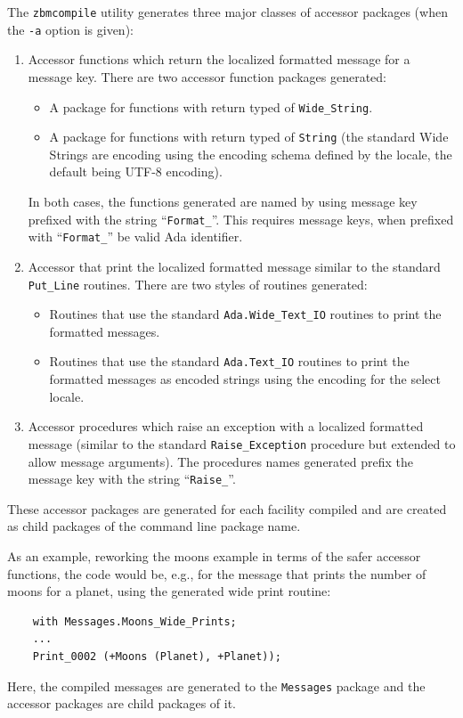 The \texttt{zbmcompile} utility generates three major classes of accessor
packages (when the \texttt{-a} option is given):
\begin{enumerate}
\item	Accessor functions which return the localized formatted message for
	a message key.  There are two accessor function packages generated:
	\begin{itemize}
	\item	A package for functions with return typed of
	 	\texttt{Wide\_String}.
	\item	A package for functions with return typed of \texttt{String}
		(the standard Wide Strings are encoding using the encoding
                schema defined by the locale, the default being UTF-8 encoding).
	\end{itemize}
	In both cases, the functions generated are named by using message key
	prefixed with the string ``\texttt{Format\_}''.  This requires message
	keys, when prefixed with ``\texttt{Format\_}''  be valid Ada identifier.
\item   Accessor that print the localized formatted message similar to the
        standard \texttt{Put\_Line} routines.  There are two styles of routines
        generated:
        \begin{itemize}
        \item Routines that use the standard \texttt{Ada.Wide\_Text\_IO}
              routines to print the formatted messages.
        \item Routines that use the standard \texttt{Ada.Text\_IO}
              routines to print the formatted messages as encoded strings
              using the encoding for the select locale.
        \end{itemize}
\item	Accessor procedures which raise an exception with a localized formatted
	message (similar to the standard \texttt{Raise\_Exception} procedure
	but extended to allow message arguments).  The procedures names
	generated prefix the message key with the string ``\texttt{Raise\_}''.
\end{enumerate}

These accessor packages are generated for each facility compiled and are
created as child packages of the command line package name.

As an example, reworking the moons example in terms of the safer accessor
functions, the code would be, e.g., for the message that prints the number
of moons for a planet, using the generated wide print routine:
\begin{xmpl}
\begin{verbatim}
    with Messages.Moons_Wide_Prints;
    ...
    Print_0002 (+Moons (Planet), +Planet));
\end{verbatim}
\end{xmpl}
Here, the compiled messages are generated to the \texttt{Messages} package
and the accessor packages are child packages of it.

